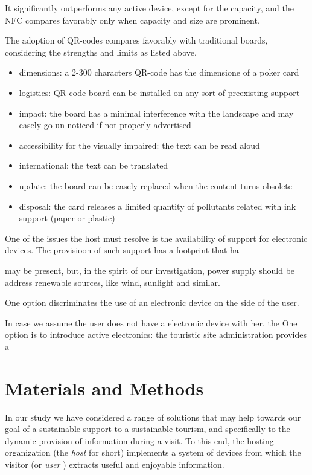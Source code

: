 \documentclass[sustainability,article,submit,pdftex,moreauthors]{Definitions/mdpi}
\begin{document}
It significantly outperforms any active device, except for the capacity, and the NFC compares favorably only when capacity and size are prominent.  

The adoption of QR-codes compares favorably with traditional boards, considering the strengths and limits as listed above.

\begin{itemize}
	\item dimensions: a 2-300 characters QR-code has the dimensione of a poker card
	\item logistics: QR-code board can be installed on any sort of preexisting support
	\item impact: the board has a minimal interference with the landscape and may easely go un-noticed if not properly advertised
	\item accessibility for the visually impaired: the text can be read aloud
	\item international: the text can be translated
	\item update: the board can be easely replaced when the content turns obsolete
	\item disposal: the card releases a limited quantity of pollutants related with ink support (paper or plastic)
\end{itemize}
		
		One of the issues the host must resolve is the availability of support for electronic devices. The provisioon of such support has a footprint that ha
		
		may be present, but, in the spirit of our investigation, power supply should be address renewable sources, like wind, sunlight and similar.
		
		
		
		One option discriminates the use of an electronic device on the side of the user. 
		
		In case we assume the user does not have a electronic device with her, the 
		One option is to introduce active electronics: the touristic site administration provides a 
		


\section{Materials and Methods}

In our study we have considered a range of solutions that may help towards our goal of a sustainable support to a sustainable tourism, and specifically to the dynamic provision of information during a visit. To this end, the hosting organization (the {\em host} for short) implements a system of devices from which the visitor (or {\em user} ) extracts useful and enjoyable information. 
\end{document}
